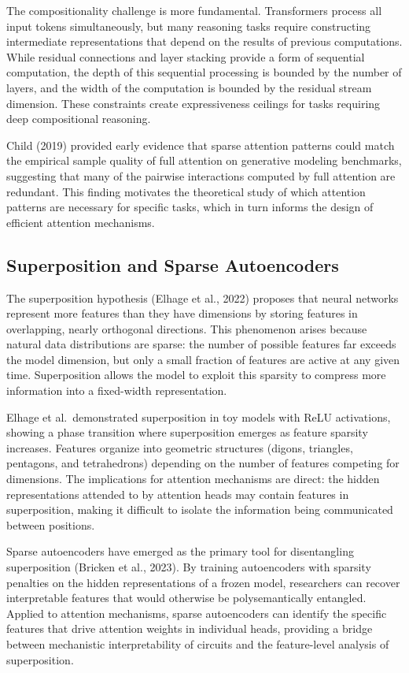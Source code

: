 \documentclass[10pt,twocolumn]{article}
\begin{document}
The compositionality challenge is more fundamental. Transformers process all input tokens simultaneously, but many reasoning tasks require constructing intermediate representations that depend on the results of previous computations. While residual connections and layer stacking provide a form of sequential computation, the depth of this sequential processing is bounded by the number of layers, and the width of the computation is bounded by the residual stream dimension. These constraints create expressiveness ceilings for tasks requiring deep compositional reasoning.

Child (2019) provided early evidence that sparse attention patterns could match the empirical sample quality of full attention on generative modeling benchmarks, suggesting that many of the pairwise interactions computed by full attention are redundant. This finding motivates the theoretical study of which attention patterns are necessary for specific tasks, which in turn informs the design of efficient attention mechanisms.

\subsection{Superposition and Sparse Autoencoders}\label{superposition-and-sparse-autoencoders}

The superposition hypothesis (Elhage et al., 2022) proposes that neural networks represent more features than they have dimensions by storing features in overlapping, nearly orthogonal directions. This phenomenon arises because natural data distributions are sparse: the number of possible features far exceeds the model dimension, but only a small fraction of features are active at any given time. Superposition allows the model to exploit this sparsity to compress more information into a fixed-width representation.

Elhage et al.~demonstrated superposition in toy models with ReLU activations, showing a phase transition where superposition emerges as feature sparsity increases. Features organize into geometric structures (digons, triangles, pentagons, and tetrahedrons) depending on the number of features competing for dimensions. The implications for attention mechanisms are direct: the hidden representations attended to by attention heads may contain features in superposition, making it difficult to isolate the information being communicated between positions.

Sparse autoencoders have emerged as the primary tool for disentangling superposition (Bricken et al., 2023). By training autoencoders with sparsity penalties on the hidden representations of a frozen model, researchers can recover interpretable features that would otherwise be polysemantically entangled. Applied to attention mechanisms, sparse autoencoders can identify the specific features that drive attention weights in individual heads, providing a bridge between mechanistic interpretability of circuits and the feature-level analysis of superposition.
\end{document}
